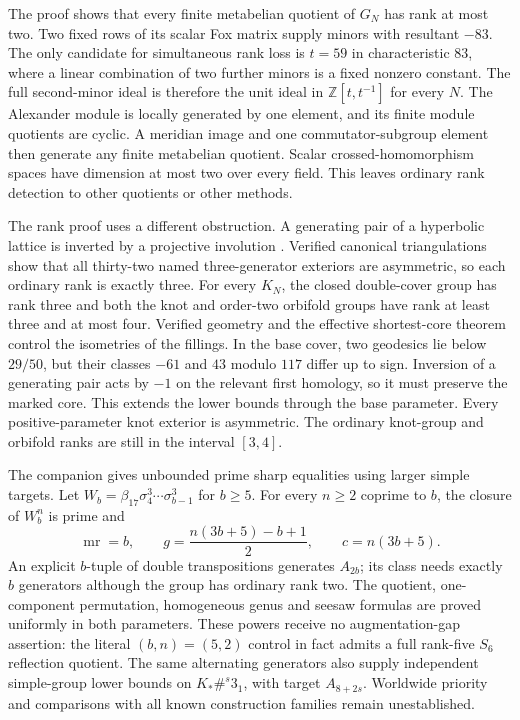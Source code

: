 \documentclass[11pt]{article}
\begin{document}
The proof 
shows that every finite metabelian quotient of $G_N$ has rank at most
two. Two fixed rows of its scalar Fox matrix supply minors with
resultant $-83$. The only candidate for simultaneous rank loss is
$t=59$ in characteristic $83$, where a linear combination of two
further minors is a fixed nonzero constant. The full second-minor
ideal is therefore the unit ideal in $\mathbb Z[t,t^{-1}]$ for every
$N$. The Alexander module is locally generated by one element, and
its finite module quotients are cyclic. A meridian image and one
commutator-subgroup element then generate any finite metabelian
quotient. Scalar crossed-homomorphism spaces have dimension at most
two over every field. This leaves ordinary rank detection to other
quotients or other methods.


The rank proof 
uses a different obstruction. A generating pair of a hyperbolic
lattice is inverted by a projective involution \cite[Lemma~22]{bw05}.
Verified canonical triangulations show that all thirty-two named
three-generator exteriors are asymmetric, so each ordinary rank is
exactly three. For every $K_N$, the closed double-cover group has rank
three and both the knot and order-two orbifold groups have rank at
least three and at most four. Verified geometry and the effective
shortest-core theorem \cite[Lemma~7.26 and Theorem~7.28]{fps22} control
the isometries of the fillings. In the base cover, two geodesics lie
below $29/50$, but their classes $-61$ and $43$ modulo $117$ differ
up to sign. Inversion of a generating pair acts by $-1$ on the
relevant first homology, so it must preserve the marked core.
This extends the lower bounds through the base parameter. Every
positive-parameter knot exterior is asymmetric. The ordinary
knot-group and orbifold ranks are still in the interval $[3,4]$.


The companion  gives
unbounded prime sharp equalities using larger simple targets.
Let $W_b=\beta_{17}\sigma_4^3\cdots\sigma_{b-1}^3$ for $b\ge5$.
For every $n\ge2$ coprime to $b$, the closure of $W_b^n$ is prime and
\[
 \operatorname{mr}=b,\qquad g=\frac{n(3b+5)-b+1}{2},
 \qquad c=n(3b+5).
\]
An explicit $b$-tuple of double transpositions generates $A_{2b}$;
its class needs exactly $b$ generators although the group has ordinary
rank two. The quotient, one-component permutation, homogeneous genus
and seesaw formulas are proved uniformly in both parameters.
These powers receive no augmentation-gap assertion: the literal
$(b,n)=(5,2)$ control in fact admits a full rank-five $S_6$ reflection
quotient. The same alternating generators also supply independent
simple-group lower bounds on $K_*\#^s3_1$, with target $A_{8+2s}$.
Worldwide priority and comparisons with all known construction
families remain unestablished.
\end{document}
